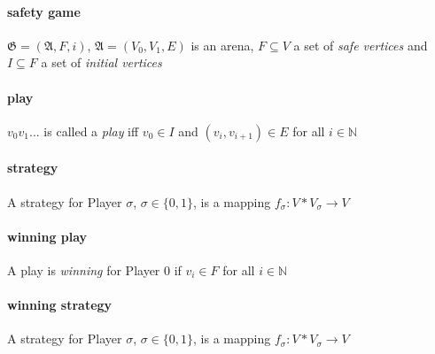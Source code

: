 \documentclass[10pt,a4paper]{article}
\theoremstyle{plain}
\theoremstyle{definition}
\begin{document}
\paragraph*{safety game} $\mathfrak{G} = (\mathfrak{A}, F, i)$, $\mathfrak{A} = (V_{0}, V_{1}, E)$ is an arena, $F \subseteq V$ a set of \textit{safe vertices} and $I \subseteq F$ a set of \textit{initial vertices}
\paragraph*{play} $v_{0}v_{1}...$ is called a \textit{play} iff $v_{0} \in I$ and $(v_{i}, v_{i+1}) \in E$ for all $i \in \mathbb{N}$
\paragraph*{strategy}A strategy for Player $\sigma$, $\sigma \in \{0,1\}$, is a mapping $f_{\sigma} : V*V_{\sigma} \to V$
\paragraph*{winning play} A play is \textit{winning} for Player 0 if $v_{i} \in F$ for all $i \in \mathbb{N}$
\paragraph*{winning strategy} 
A strategy for Player $\sigma$, $\sigma \in \{0,1\}$, is a mapping $f_{\sigma} : V*V_{\sigma} \to V$
\end{document}
